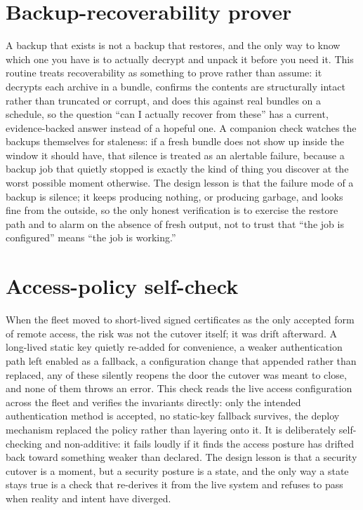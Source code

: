 \documentclass[12pt]{article}
\begin{document}
\section{Backup-recoverability prover}

A backup that exists is not a backup that restores, and the only way to know which one you have is to actually decrypt and unpack it before you need it. This routine treats recoverability as something to prove rather than assume: it decrypts each archive in a bundle, confirms the contents are structurally intact rather than truncated or corrupt, and does this against real bundles on a schedule, so the question ``can I actually recover from these'' has a current, evidence-backed answer instead of a hopeful one. A companion check watches the backups themselves for staleness: if a fresh bundle does not show up inside the window it should have, that silence is treated as an alertable failure, because a backup job that quietly stopped is exactly the kind of thing you discover at the worst possible moment otherwise. The design lesson is that the failure mode of a backup is silence; it keeps producing nothing, or producing garbage, and looks fine from the outside, so the only honest verification is to exercise the restore path and to alarm on the absence of fresh output, not to trust that ``the job is configured'' means ``the job is working.''

\section{Access-policy self-check}

When the fleet moved to short-lived signed certificates as the only accepted form of remote access, the risk was not the cutover itself; it was drift afterward. A long-lived static key quietly re-added for convenience, a weaker authentication path left enabled as a fallback, a configuration change that appended rather than replaced, any of these silently reopens the door the cutover was meant to close, and none of them throws an error. This check reads the live access configuration across the fleet and verifies the invariants directly: only the intended authentication method is accepted, no static-key fallback survives, the deploy mechanism replaced the policy rather than layering onto it. It is deliberately self-checking and non-additive: it fails loudly if it finds the access posture has drifted back toward something weaker than declared. The design lesson is that a security cutover is a moment, but a security posture is a state, and the only way a state stays true is a check that re-derives it from the live system and refuses to pass when reality and intent have diverged.
\end{document}
